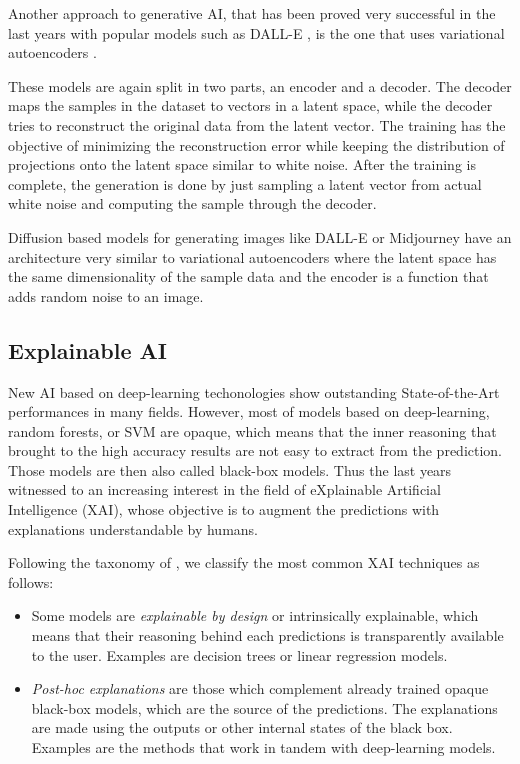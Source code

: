 \documentclass[]{marticle}
\begin{document}
Another approach to generative AI, that has been proved very successful in the last years with
popular models such as DALL-E \cite{dall-e}, is the one that uses variational autoencoders
\cite{variational-autoencoders}.

These models are again split in two parts, an encoder and a decoder. The decoder maps the samples in
the dataset to vectors in a latent space, while the decoder tries to reconstruct the original data
from the latent vector. The training has the objective of minimizing the reconstruction error while
keeping the distribution of projections onto the latent space similar to white noise. After the
training is complete, the generation is done by just sampling a latent vector from actual white
noise and computing the sample through the decoder.

Diffusion based models for generating images like DALL-E or Midjourney have an architecture very
similar to variational autoencoders where the latent space has the same dimensionality of the sample
data and the encoder is a function that adds random noise to an image.

\subsection{Explainable AI}

New AI based on deep-learning techonologies show outstanding State-of-the-Art performances in many
fields. However, most of models based on deep-learning, random forests, or SVM are opaque, which
means that the inner reasoning that brought to the high accuracy results are not easy to extract
from the prediction.  Those models are then also called black-box models. Thus the last years
witnessed to an increasing interest in the field of eXplainable Artificial Intelligence (XAI), whose
objective is to augment the predictions with explanations understandable by humans.

Following the taxonomy of \cite{xai-survey}, we classify the most common XAI techniques as follows:

\begin{itemize}
\item Some models are \textit{explainable by design} or intrinsically explainable, which means that
    their reasoning behind each predictions is transparently available to the user. Examples are
    decision trees or linear regression models.

\item \textit{Post-hoc explanations} are those which complement already trained opaque black-box
    models, which are the source of the predictions. The explanations are made using the outputs or
    other internal states of the black box.
    Examples are the methods that work in tandem with deep-learning models.
\end{itemize}
\end{document}
